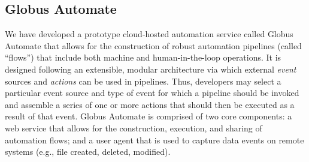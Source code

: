 \documentclass{aip-cp}
\begin{document}



\subsection{Globus Automate}


We have developed a prototype cloud-hosted automation service called Globus Automate
that allows for the construction of robust automation pipelines (called ``flows'')
that include both machine and human-in-the-loop operations. 
It is designed following an extensible, modular architecture via which external
\emph{event} sources and \emph{actions} can be used in pipelines. 
Thus, developers may select a particular event source and type of event
for which a pipeline should be invoked and assemble a 
series of one or more actions that should then be executed as 
a result of that event.
Globus Automate is comprised of two core components: a web service
that allows for the construction, execution, and sharing of automation
flows; and a user agent that is used to capture data events on remote systems
(e.g., file created, deleted, modified). 
\end{document}
